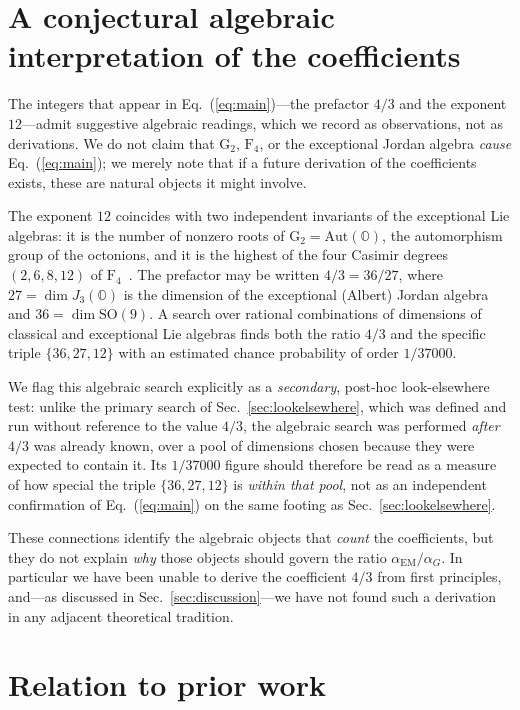 \documentclass[aps,prd,preprint,amsmath,amssymb,nofootinbib]{revtex4-2}
\begin{document}
\section{A conjectural algebraic interpretation of the coefficients}
\label{sec:algebra}

The integers that appear in Eq.~(\ref{eq:main})---the prefactor $4/3$ and the
exponent $12$---admit suggestive algebraic readings, which we record as
observations, not as derivations. We do not claim that $\mathrm{G}_2$,
$\mathrm{F}_4$, or the exceptional Jordan algebra \emph{cause}
Eq.~(\ref{eq:main}); we merely note that if a future derivation of the
coefficients exists, these are natural objects it might involve.

The exponent $12$ coincides with two independent invariants of the exceptional
Lie algebras: it is the number of nonzero roots of
$\mathrm{G}_2 = \mathrm{Aut}(\mathbb{O})$, the automorphism group of the
octonions, and it is the highest of the four Casimir degrees $(2,6,8,12)$ of
$\mathrm{F}_4$~\cite{bincer1993}. The prefactor may be written
$4/3 = 36/27$, where $27 = \dim J_3(\mathbb{O})$ is the dimension of the
exceptional (Albert) Jordan algebra and $36 = \dim \mathrm{SO}(9)$. A search
over rational combinations of dimensions of classical and exceptional Lie
algebras finds both the ratio $4/3$ and the specific triple
$\{36,27,12\}$ with an estimated chance probability of order $1/37000$.

We flag this algebraic search explicitly as a \emph{secondary}, post-hoc
look-elsewhere test: unlike the primary search of
Sec.~\ref{sec:lookelsewhere}, which was defined and run without reference to
the value $4/3$, the algebraic search was performed \emph{after} $4/3$ was
already known, over a pool of dimensions chosen because they were expected to
contain it. Its $1/37000$ figure should therefore be read as a measure of how
special the triple $\{36,27,12\}$ is \emph{within that pool}, not as an
independent confirmation of Eq.~(\ref{eq:main}) on the same footing as
Sec.~\ref{sec:lookelsewhere}.

These connections identify the algebraic objects that \emph{count} the
coefficients, but they do not explain \emph{why} those objects should govern
the ratio $\alpha_{\mathrm{EM}}/\alpha_G$. In particular we have been unable to
derive the coefficient $4/3$ from first principles, and---as discussed in
Sec.~\ref{sec:discussion}---we have not found such a derivation in any adjacent
theoretical tradition.

\section{Relation to prior work}
\end{document}
